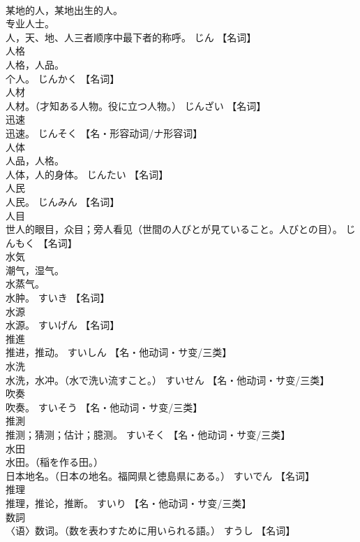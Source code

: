 \documentclass[8pt]{extreport}
\begin{document}
\begin{CJK}{UTF8}{min}
\\	某地的人，某地出生的人。 
\\	专业人士。 
\\	人，天、地、人三者顺序中最下者的称呼。	じん		【名词】
\\	人格	
\\	人格，人品。 
\\	个人。	じんかく		【名词】
\\	人材	
\\	人材。（才知ある人物。役に立つ人物。）	じんざい		【名词】
\\	迅速	
\\	迅速。	じんそく		【名・形容动词/ナ形容词】
\\	人体	
\\	人品，人格。 
\\	人体，人的身体。	じんたい		【名词】
\\	人民	
\\	人民。	じんみん		【名词】
\\	人目	
\\	世人的眼目，众目；旁人看见（世間の人びとが見ていること。人びとの目）。	じんもく		【名词】
\\	水気	
\\	潮气，湿气。 
\\	水蒸气。 
\\	水肿。	すいき		【名词】
\\	水源	
\\	水源。	すいげん		【名词】
\\	推進	
\\	推进，推动。	すいしん		【名・他动词・サ变/三类】
\\	水洗	
\\	水洗，水冲。（水で洗い流すこと。）	すいせん		【名・他动词・サ变/三类】
\\	吹奏	
\\	吹奏。	すいそう		【名・他动词・サ变/三类】
\\	推測	
\\	推测；猜测；估计；臆测。	すいそく		【名・他动词・サ变/三类】
\\	水田	
\\	水田。（稲を作る田。） 
\\	日本地名。（日本の地名。福岡県と徳島県にある。）	すいでん		【名词】
\\	推理	
\\	推理，推论，推断。	すいり		【名・他动词・サ变/三类】
\\	数詞	
\\	〈语〉数词。（数を表わすために用いられる語。）	すうし		【名词】

\end{CJK}
\end{document}
